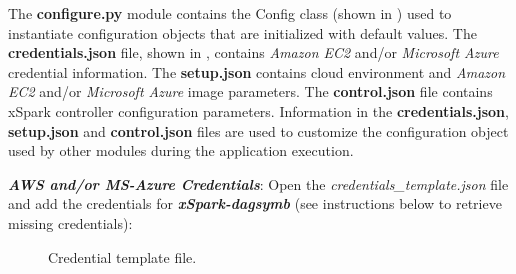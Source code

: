 The \textbf{configure.py} module contains the Config class (shown in ) used to instantiate configuration objects that are initialized with default values. The \textbf{credentials.json} file, shown in , contains \emph{Amazon EC2}
and/or \emph{Microsoft Azure} credential information. The
\textbf{setup.json} contains cloud environment and \emph{Amazon EC2}
and/or \emph{Microsoft Azure} image parameters. The
\textbf{control.json} file contains xSpark controller configuration
parameters. Information in the \textbf{credentials.json},
\textbf{setup.json} and \textbf{control.json} files are used to
customize the configuration object used by other modules during the
application execution.

\textbf{\textit{AWS and/or MS-Azure Credentials}}: Open the
\emph{credentials\_template.json} file and add the credentials for \textbf{\textit{xSpark-dagsymb}} (see instructions below to retrieve missing
credentials):
\begin{figure}[thbp]
	\centering
	\begin{minipage}{0,65\columnwidth}
		  
	\end{minipage}
	\caption{Credential template file.}
	\label{fig:xspark_dagsymb_credentials_template}
\end{figure}


